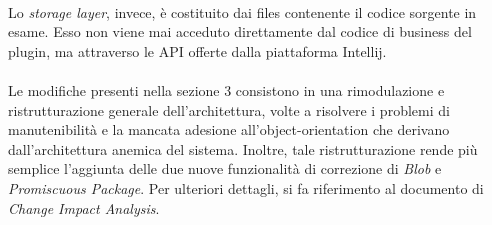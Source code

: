 \paragraph{} Lo \textit{storage layer}, invece, è costituito dai files contenente il codice sorgente in esame. Esso non viene mai acceduto direttamente dal codice di business del plugin, ma attraverso le API offerte dalla piattaforma Intellij.

\paragraph{} Le modifiche presenti nella sezione 3 consistono in una rimodulazione e ristrutturazione generale dell'architettura, volte a risolvere i problemi di manutenibilità e la mancata adesione all'object-orientation che derivano dall'architettura anemica del sistema. Inoltre, tale ristrutturazione rende più semplice l'aggiunta delle due nuove funzionalità di correzione di \textit{Blob} e \textit{Promiscuous Package}. Per ulteriori dettagli, si fa riferimento al documento di \textit{Change Impact Analysis}.  